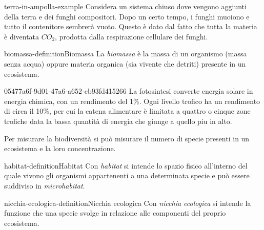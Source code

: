 \documentclass[preview]{standalone}
\begin{document}

\begin{snippetexample}{terra-in-ampolla-example}{}
    Considera un sistema chiuso dove vengono aggiunti della terra e dei funghi compositori.
    Dopo un certo tempo, i funghi muoiono e tutto il contenitore sembrerà vuoto.
    Questo è dato dal fatto che tutta la materia è diventata \(CO_2\),
    prodotta dalla respirazione cellulare dei funghi.
\end{snippetexample}


\begin{snippetdefinition}{biomassa-definition}{Biomassa}
    La \textit{biomassa} è la massa di un organismo (massa senza acqua)
    oppure materia organica (sia vivente che detriti) presente in un ecosistema.
\end{snippetdefinition}

\begin{snippet}{05477a6f-9d01-47a6-a652-cb93fd415266}
    La fotosintesi converte energia solare in energia chimica, con un rendimento del 1\%.
    Ogni livello trofico ha un rendimento di circa il 10\%, per cui la catena alimentare
    è limitata a quattro o cinque zone trofiche data la bassa quantità di energia
    che giunge a quello piu in alto.

    Per misurare la biodiversità si può misurare il numero di specie presenti in un ecosistema
    e la loro concentrazione.
\end{snippet}

\begin{snippetdefinition}{habitat-definition}{Habitat}
    Con \textit{habitat} si intende lo spazio fisico all'interno del quale vivono gli organismi
    appartenenti a una determinata specie e può essere suddiviso in \textit{microhabitat}.
\end{snippetdefinition}

\begin{snippetdefinition}{nicchia-ecologica-definition}{Nicchia ecologica}
    Con \textit{nicchia ecologica} si intende la funzione che una specie svolge
    in relazione alle componenti del proprio ecosistema.
\end{snippetdefinition}

\end{document}
